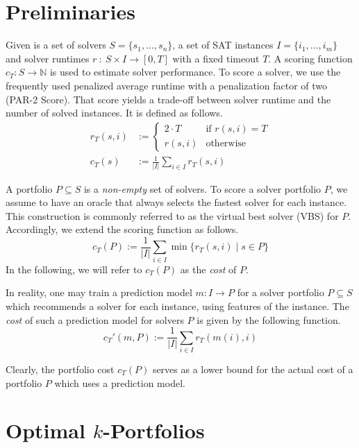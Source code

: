 \documentclass[conference]{IEEEtran}
\begin{document}
\section{Preliminaries}
\label{sec:preliminaries}

Given is a set of solvers $S = \{s_1, \dots, s_n\}$, a set of SAT instances $I = \{i_1, \dots, i_m\}$ and solver runtimes $r~:~S \times I \rightarrow [0, T]$ with a fixed timeout $T$.
A scoring function $c_T : S \rightarrow \mathbb{N}$ is used to estimate solver performance. 
To score a solver, we use the frequently used penalized average runtime with a penalization factor of two (PAR-2 Score). 
That score yields a trade-off between solver runtime and the number of solved instances.
It is defined as follows.%
\begin{align}
r_T(s,i) &:= \begin{cases}
	2 \cdot T & \text{if }r(s,i) = T\\
	r(s,i) & \text{otherwise}
\end{cases} \tag*{Penalized Runtimes}\\[.5em]
c_T(s) &:= \frac{1}{|I|} \sum_{i \in I}{r_T(s,i)} \tag*{PAR-2 Score}
\end{align}

A portfolio $P \subseteq S$ is a \emph{non-empty} set of solvers.
To score a solver portfolio $P$, we assume to have an oracle that always selects the fastest solver for each instance. 
This construction is commonly referred to as the virtual best solver (VBS) for $P$. 
Accordingly, we extend the scoring function as follows.%
$$
	c_{T}(P) := \frac{1}{|I|} \sum\limits_{i \in I}{\min\{r_T(s,i) \mid s \in P\}}
$$
In the following, we will refer to $c_{T}(P)$ as the \emph{cost} of $P$. 

In reality, one may train a prediction model $m : I \rightarrow P$ for a solver portfolio $P \subseteq S$ which recommends a solver for each instance, using features of the instance. 
The \emph{cost} of such a prediction model for solvers $P$ is given by the following function.%
$$
	c_{T}'(m,P) := \frac{1}{|I|} \sum\limits_{i \in I}{r_T(m(i),i)}
$$

Clearly, the portfolio cost $c_{T}(P)$ serves as a lower bound for the actual cost of a portfolio $P$ which uses a prediction model.

\section{Optimal $k$-Portfolios}
\label{sec:approach}
\end{document}
